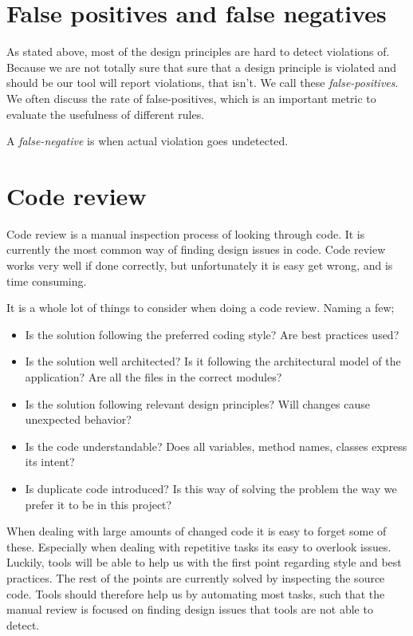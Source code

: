 \documentclass{report}
\begin{document}
\section{False positives and false negatives}
As stated above, most of the design principles are hard to detect violations of. Because we are not totally sure that sure that a design principle is violated and should be our tool will report violations, that isn't. We call these \textit{false-positives}. We often discuss the rate of false-positives, which is an important metric to evaluate the usefulness of different rules.

A \textit{false-negative} is when actual violation goes undetected. 



\section{Code review}
\label{code-review}
Code review is a manual inspection process of looking through code. It is currently the most common way of finding design issues in code. Code review works very well if done correctly, but unfortunately it is easy get wrong, and is time consuming. 

It is a whole lot of things to consider when doing a code review. Naming a few;

\begin{itemize}
    \item Is the solution following the preferred coding style? Are best practices used?
    \item Is the solution well architected? Is it following the architectural model of the application? Are all the files in the correct modules?
    \item Is the solution following relevant design principles? Will changes cause unexpected behavior? 
    \item Is the code understandable? Does all variables, method names, classes express its intent?
    \item Is duplicate code introduced? Is this way of solving the problem the way we prefer it to be in this project?
\end{itemize}

When dealing with large amounts of changed code it is easy to forget some of these. Especially when dealing with repetitive tasks its easy to overlook issues. Luckily, tools will be able to help us with the first point regarding style and best practices. The rest of the points are currently solved by inspecting the source code. Tools should therefore help us by automating most tasks, such that the manual review is focused on finding design issues that tools are not able to detect. 
\end{document}
